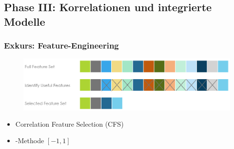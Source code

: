 \documentclass{beamer}
\begin{document}
\subsection{\textbf{Phase III}: Korrelationen und integrierte Modelle}

\begin{frame}
  \frametitle{Exkurs: Feature-Engineering}

  \begin{figure}
    \centering
    \includegraphics[width=\textwidth]{images/feature_engineering.png}
  \end{figure}

  \begin{itemize}
    \item Correlation Feature Selection (CFS)
    \item {}-Methode $[-1, 1]$
  \end{itemize}  
\end{frame}
\end{document}
